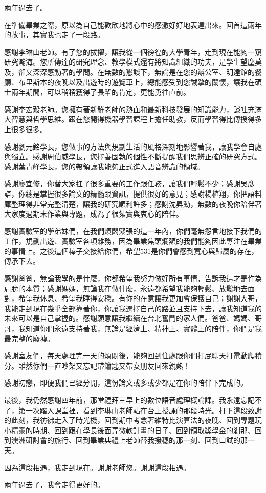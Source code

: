 \NTUtitlepage  %

\newpage
\setcounter{page}{1}
%
\NTUoralpage  %

\mydoublespacing
\begin{acknowledgement} %
兩年過去了。

在準備畢業之際，原以為自己能歡欣地將心中的感激好好地表達出來。回首這兩年的故事，其實我也走了一段路。

感謝李琳山老師。有了您的拔擢，讓我從一個徬徨的大學青年，走到現在能夠一窺研究瀚海。您所傳達的研究理念、教學模式還有將知識組織的功夫，是學生望塵莫及，卻又深深感動著的學問。在無數的懇談下，無論是在您的辦公室、明達館的餐廳、布里斯本的夜晚以及出遊時的遊覽車上，總能感受到您誠摯的關懷，讓我在碩士兩年期間，可以稍稍獲得了長輩的肯定，更能勇往直前。

感謝李宏毅老師。您擁有著新鮮老師的熱血和最新科技發展的知識能力，談吐充滿大智慧與哲學思維。跟在您開得機器學習課程上擔任助教，反而學習得比傳授得多上很多很多。

感謝劉元銘學長，您做事的方法與規劃生活的風格深刻地影響著我，讓我學會自處與獨立。感謝周伯威學長，您擇善固執的個性不斷提醒我們思辨正確的研究方式。感謝葉青峰學長，您的帶領讓我能夠正式進入語音辨識的領域。

感謝廖宜修，你替大家扛了很多重要的工作跟任務，讓我們輕鬆不少；感謝吳彥諶，你總是掌握很多論文的精髓跟資訊，提供很好的意見；感謝楊植翔，你把語料庫整理得非常完整清楚，讓我的研究順利許多；感謝沈昇勳，無數的夜晚你陪伴著大家度過期末作業與專題，成為了很紮實與衷心的陪伴。

感謝實驗室的學弟妹們，在我們煩悶緊張的這一年內，你們毫無怨言地接下我們的工作，規劃出遊、實驗室各項雜務，因為畢業焦頭爛額的我們能夠因此專注在畢業的事情上。之後這個棒子交接給你們，希望531是你們會感到寬心與歸屬的存在，傳承下去。

感謝爸爸，無論我學的是什麼，你都希望我努力做好所有事情，告訴我這才是作為肩膀的本質；感謝媽媽，無論我在做什麼，永遠都希望我能夠輕鬆、放鬆地去面對，希望我休息、希望我睡得安穩。有你的在意讓我更加會保護自己；謝謝大哥，我能走到現在幾乎全部靠著你，你讓我選擇自己的路並且支持下去，讓我知道我的未來可以是自己掌握的。感謝願意讓我繼續在台北奮鬥的家人們。爸爸、媽媽、哥哥，我知道你們永遠支持著我，無論是經濟上、精神上、實體上的陪伴，你們是我最完整的廢墟。

感謝室友們，每天處理完一天的煩悶後，能夠回到住處跟你們打屁聊天打電動爬積分。雖然你們一直吵架又忘記帶鑰匙又帶女朋友回來親熱！

感謝初戀，即便我們已經分開，這份論文或多或少都是在你的陪伴下完成的。

最後，我仍然感謝四年前，那堂禮拜三早上的數位語音處理概論課。我永遠忘記不了，第一次踏入課堂裡，看到李琳山老師站在台上授課的那段時光。打下這段致謝的此刻，我彷彿走入了時光機，回到期中考念著維特比演算法的夜晚、回到專題玩小精靈的時期、回到跟在學長後面弄微軟計畫的日子、回到領取獎學金的剎那、回到澳洲研討會的旅行、回到畢業典禮上老師替我撥穗的那一刻、回到口試的那一天。

因為這段相遇，我走到現在。謝謝老師您。謝謝這段相遇。

兩年過去了，我會走得更好的。
\end{acknowledgement}

